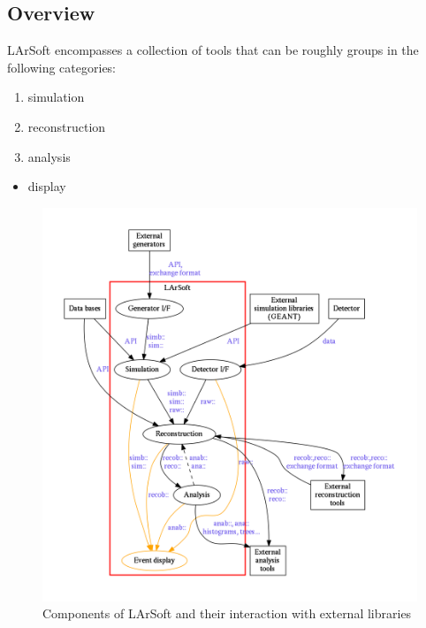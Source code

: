 \documentclass{article}
\begin{document}
\subsection{Overview}\label{overview}

LArSoft encompasses a collection of tools that can be roughly groups in
the following categories:

\begin{enumerate}
\def\labelenumi{\arabic{enumi}.}
\item
  simulation
\item
  reconstruction
\item
  analysis
\end{enumerate}

\begin{itemize}
\item
  display
\end{itemize}

\begin{figure}[htbp]
\centering
\includegraphics[width=\textwidth]{figures/LArSoftArchitectureGraph.pdf}
\caption{\label{fig:LArSoftProcessingChain}Components of LArSoft and
their interaction with external libraries}
\end{figure}
\end{document}
